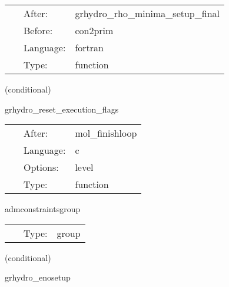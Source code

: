 \documentclass{article}
\begin{document}
 \begin{tabular*}{160mm}{cll} 
~ & After:  & grhydro\_rho\_minima\_setup\_final \\ 
~ & Before:  & con2prim \\ 
~ & Language:  & fortran \\ 
~ & Type:  & function \\ 
\end{tabular*} 


\vspace{5mm}

   (conditional) 

\hspace{5mm} grhydro\_reset\_execution\_flags 

\hspace{5mm}{\it reset execution flags to 'yeah, execute'! } 


\hspace{5mm}

 \begin{tabular*}{160mm}{cll} 
~ & After:  & mol\_finishloop \\ 
~ & Language:  & c \\ 
~ & Options:  & level \\ 
~ & Type:  & function \\ 
\end{tabular*} 


\vspace{5mm}


\hspace{5mm} admconstraintsgroup 

\hspace{5mm}{\it evaluate adm constraints, and perform symmetry boundary conditions } 


\hspace{5mm}

 \begin{tabular*}{160mm}{cll} 
~ & Type:  & group \\ 
\end{tabular*} 


\vspace{5mm}

   (conditional) 

\hspace{5mm} grhydro\_enosetup 

\hspace{5mm}{\it coefficients for eno reconstruction } 
\end{document}
